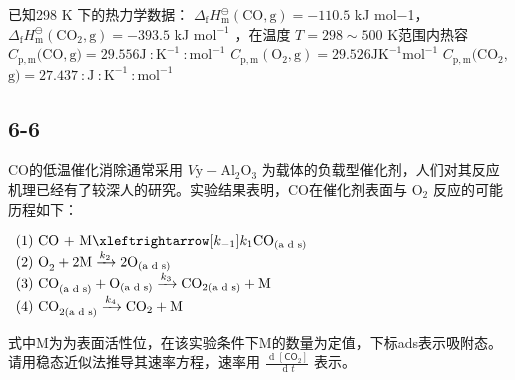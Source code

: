 已知298 K 下的热⼒学数据： $\Delta _ { \mathrm { f } } H _ { \mathrm { m } } ^ { \ominus } ( \mathrm { C O } , \mathrm { g } ) = - 1 1 0 . 5$ kJ mol−1， $\Delta _ { \mathrm { f } } H _ { \mathrm { m } } ^ { \ominus } ( \mathrm { C O } _ { 2 } , \mathrm { g } ) = - 3 9 3 . 5$ kJ $\mathrm { m o l ^ { - 1 } }$ ，在温度 $T = 2 9 8 { \sim } 5 0 0$ K范围内热容 $C _ { \mathrm { p , m } } ( \mathrm { C O , g ) = 2 9 . 5 5 6 J \ : K ^ { - 1 } \ : m o l ^ { - 1 } }$ $C _ { \mathrm { p , m } } ( \mathrm { O } _ { 2 } , \mathrm { g } ) { = 2 9 . 5 2 6 \mathrm { J } \mathrm { K } ^ { \mathrm { - 1 } } \mathrm { m o l } ^ { \mathrm { - 1 } } }$ $C _ { \mathrm { p , m } } ( \mathrm { C O } _ { 2 } ,$ $\mathrm { g ) = 2 7 . 4 3 7 \ : J \ : K ^ { - 1 } \ : m o l ^ { - 1 } }$

\subsection*{6-6}
CO的低温催化消除通常采⽤ $V \mathrm { { y - A l _ { 2 } O _ { 3 } } }$ 为载体的负载型催化剂，⼈们对其反应机理已经有了较深⼈的研究。实验结果表明，CO在催化剂表⾯与 $\mathrm { O _ { 2 } }$ 反应的可能历程如下：

$
\begin{array}{l} \text {(1) CO + M} \xleftrightarrow [ k _ {- 1} ] {k _ {1}} \mathrm{CO} _ {\text {(a d s)}} \\ \text {(2) O} _ {2} + 2 \mathrm{M} \xrightarrow {k _ {2}} 2 \mathrm{O} _ {\text {(a d s)}} \\ \text {(3) CO} _ {\text {(a d s)}} + \mathrm{O} _ {\text {(a d s)}} \xrightarrow {k _ {3}} \mathrm{CO} _ {2 \text {(a d s)}} + \mathrm{M} \\ \text {(4) CO} _ {2 \text {(a d s)}} \xrightarrow {k _ {4}} \mathrm{CO} _ {2} + \mathrm{M} \end{array}
$

式中M为为表⾯活性位，在该实验条件下M的数量为定值，下标ads表⽰吸附态。请⽤稳态近似法推导其速率⽅程，速率⽤ $\frac { \textrm { d } [ \mathsf { C O } _ { 2 } ] } { \textrm { d } t }$ 表⽰。
